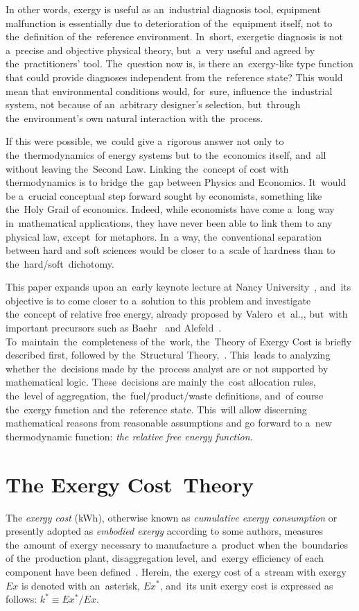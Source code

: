 \documentclass[energies,article,accept,moreauthors,pdftex]{Definitions/mdpi}
\begin{document}
In other words, exergy is useful as an~industrial diagnosis tool, equipment malfunction is essentially due to deterioration of the~equipment itself, not to the~definition of the~reference environment. In~short, exergetic diagnosis is not a~precise and objective physical theory, but~a~very useful and agreed by the~practitioners’ tool. The~question now is, is there an~exergy-like type function that could provide diagnoses independent from the~reference state? This would mean that environmental conditions would, for~sure, influence the~industrial system, not because of an~arbitrary designer's selection, but~through the~environment's own natural interaction with the~process.

If this were possible, we~could give a~rigorous answer not only to the~thermodynamics of energy systems but to the~economics itself, and~all without leaving the~Second Law. Linking the~concept of cost with thermodynamics is to bridge the~gap between Physics and Economics. It~would be a~crucial conceptual step forward sought by economists, something like the~Holy Grail of economics. Indeed, while economists have come a~long way in~mathematical applications, they have never been able to link them to any physical law, except~for metaphors. In~a way, the~conventional separation between hard and soft sciences would be closer to a~scale of hardness than to the~hard/soft~dichotomy.

This paper expands upon an~early keynote lecture at Nancy University~\cite{Valero2018}, and~its objective is to come closer to a~solution to this problem and investigate the~concept of relative free energy, already proposed by Valero~et~al.,\cite{Valero1992b}, but~with important precursors such as Baehr~\cite{Baehr2005} and Alefeld~\cite{Alefeld1988}. To~maintain~the~completeness of the~work, the~Theory of Exergy Cost is briefly described first, followed by the~Structural Theory,~\cite{Valero1992a}. This~leads to analyzing whether the~decisions made by the~process analyst are or not supported by mathematical logic. These~decisions are mainly the~cost allocation rules, the~level of aggregation, the~fuel/product/waste definitions, and~of course the~exergy function and the~reference state. This~will allow discerning mathematical reasons from reasonable assumptions and go forward to a~new thermodynamic function: \emph{the relative free energy function}.

\section{The Exergy Cost~Theory}
The \emph{exergy cost} (kWh), otherwise known as \emph{cumulative exergy consumption} \cite{Morris1986,Szargut1988} or presently adopted as \emph{embodied exergy} according to some authors, measures the~amount of exergy necessary to manufacture a~product when the~boundaries of the~production plant, disaggregation level, and~exergy efficiency of each component have been defined~\cite{Valero1986a,Lozano1993}. Herein, the~exergy cost of a~stream with exergy $Ex$ is denoted with an~asterisk, $Ex^*$, and~its unit exergy cost is expressed as follows: $k^*\equiv Ex^*/Ex$.
\end{document}
